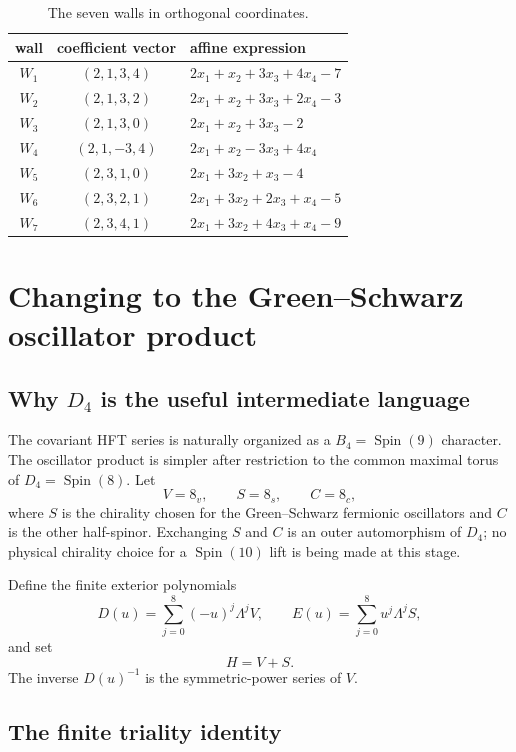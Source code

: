 \documentclass[11pt,a4paper]{article}
\theoremstyle{definition}
\newcommand{\Spin}{\operatorname{Spin}}
\begin{document}
\begin{table}[ht]
\centering
\caption{The seven walls in orthogonal coordinates.}
\label{tab:orthogonal-walls}
\begin{tabular}{ccl}
\toprule
wall & coefficient vector & affine expression \\
\midrule
$W_1$ & $(2,1,3,4)$ & $2x_1+x_2+3x_3+4x_4-7$ \\
$W_2$ & $(2,1,3,2)$ & $2x_1+x_2+3x_3+2x_4-3$ \\
$W_3$ & $(2,1,3,0)$ & $2x_1+x_2+3x_3-2$ \\
$W_4$ & $(2,1,-3,4)$ & $2x_1+x_2-3x_3+4x_4$ \\
$W_5$ & $(2,3,1,0)$ & $2x_1+3x_2+x_3-4$ \\
$W_6$ & $(2,3,2,1)$ & $2x_1+3x_2+2x_3+x_4-5$ \\
$W_7$ & $(2,3,4,1)$ & $2x_1+3x_2+4x_3+x_4-9$ \\
\bottomrule
\end{tabular}
\end{table}

\section{Changing to the Green--Schwarz oscillator product}

\subsection{Why $D_4$ is the useful intermediate language}

The covariant HFT series is naturally organized as a $B_4=\Spin(9)$
character.  The oscillator product is simpler after restriction to the common
maximal torus of $D_4=\Spin(8)$.  Let
\[
   V=8_v,
   \qquad S=8_s,
   \qquad C=8_c,
\]
where $S$ is the chirality chosen for the Green--Schwarz fermionic
oscillators and $C$ is the other half-spinor.  Exchanging $S$ and $C$ is an
outer automorphism of $D_4$; no physical chirality choice for a
$\Spin(10)$ lift is being made at this stage.

Define the finite exterior polynomials
\[
   D(u)=\sum_{j=0}^{8}(-u)^j\Lambda^jV,
   \qquad
   E(u)=\sum_{j=0}^{8}u^j\Lambda^jS,
\]
and set
\[
   H=V+S.
\]
The inverse $D(u)^{-1}$ is the symmetric-power series of $V$.

\subsection{The finite triality identity}
\end{document}
